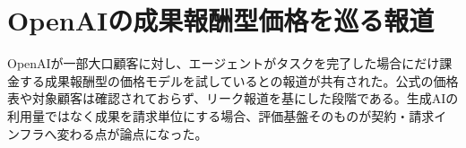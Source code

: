 \section{OpenAIの成果報酬型価格を巡る報道}
OpenAIが一部大口顧客に対し、エージェントがタスクを完了した場合にだけ課金する成果報酬型の価格モデルを試しているとの報道が共有された。公式の価格表や対象顧客は確認されておらず、リーク報道を基にした段階である。生成AIの利用量ではなく成果を請求単位にする場合、評価基盤そのものが契約・請求インフラへ変わる点が論点になった。
